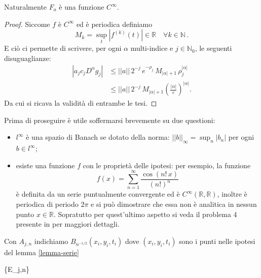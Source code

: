 \begin{example}
\begin{remark}
Naturalmente $F_a$ è una funzione $C^\infty$.
\end{remark}

\begin{proof}
Siccome $f$ è $C^\infty$ ed è periodica definiamo
\begin{equation*}
M_k=\sup_t|f^{(k)}(t)| \in \mathbb{R} \quad \forall k \in \mathbb{N}\, .
\end{equation*}
E ciò ci permette di scrivere, per ogni $\alpha$ multi-indice e $j\in \mathbb{N}_0$, le seguenti disuguaglianze:
\begin{align*}
|a_jc_jD^{\alpha}g_j| &\leq ||a|| \, 2^{-j} \, e^{-\rho_j} \, M_{| \alpha |+1} \, \rho_j^{| \alpha |}\\
&\leq ||a|| \, 2^{-j} \, M_{| \alpha |+1} \left(\frac{| \alpha |}{e}\right)^{| \alpha |}.
\end{align*}
Da cui si ricava la validità di entrambe le tesi.
\end{proof}

\begin{remark}
Prima di proseguire è utile soffermarsi brevemente su due questioni:
\begin{itemize}
\item
$l^{\infty}$ è una spazio di Banach se dotato della norma: $||b||_\infty=\sup_n|b_n|$ per ogni $b \in l^{\infty}$;
\item
esiste una funzione $f$ con le proprietà delle ipotesi: per esempio, la funzione $$f(x)=\sum_{n=1}^\infty\frac{\cos(n!\,x)}{(n!)^n}$$ è definita da un serie puntualmente convergente ed è $C^{\infty}(\mathbb{R},\mathbb{R})$, inoltre è periodica di periodo $2\pi$ e si può dimostrare che essa non è analitica in nessun punto $x\in\mathbb{R}$. Sopratutto per quest'ultimo aspetto si veda il problema 4 presente in \cite[cap.3]{John} per maggiori dettagli.
\end{itemize}
\end{remark}

Con $A_{j,n}$ indichiamo $B_{n^{-1/2}}(x_i,y_i,t_i)$ dove $(x_i,y_i,t_i)$ sono i punti nelle ipotesi del lemma \ref{lemma-serie}
\begin{lemma}\label{lemma-e}
{\{E_{j,n}\} }
\end{lemma}


\end{example}

